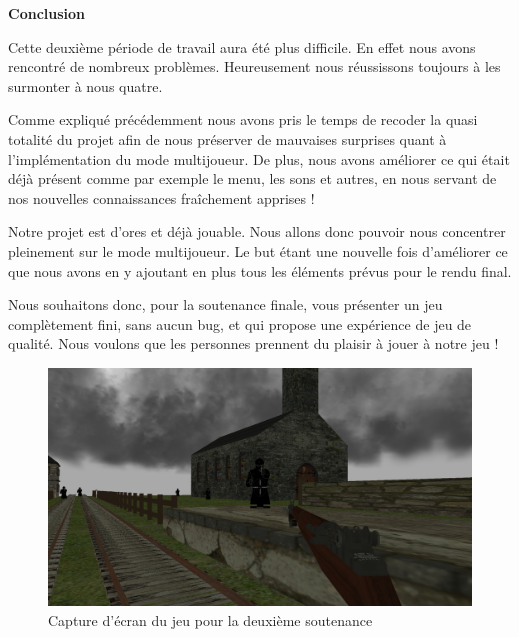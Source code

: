 \documentclass[11pt]{report}
\begin{document}
\newpage
\textbf{{\huge Conclusion}} \vspace{7mm}

Cette deuxième période de travail aura été plus difficile. En effet nous avons rencontré de nombreux problèmes. Heureusement nous réussissons toujours à les surmonter à nous quatre. 

Comme expliqué précédemment nous avons pris le temps de recoder la quasi totalité du projet afin de nous préserver de mauvaises surprises quant à l'implémentation du mode multijoueur. De plus, nous avons améliorer ce qui était déjà présent comme par exemple le menu, les sons et autres, en nous servant de nos nouvelles connaissances fraîchement apprises !

Notre projet est d'ores et déjà jouable. Nous allons donc pouvoir nous concentrer pleinement sur le mode multijoueur. Le but étant une nouvelle fois d’améliorer ce que nous avons en y ajoutant en plus tous les éléments prévus pour le rendu final.

Nous souhaitons donc, pour la soutenance finale, vous présenter un jeu complètement fini, sans aucun bug,  et qui propose une expérience de jeu de qualité. Nous voulons que les personnes prennent du plaisir à jouer à notre jeu !\\

\begin{figure}[htbp]
\centering
\includegraphics[scale=0.20]{conclu-rendu.png}
\caption{ Capture d’écran du jeu pour la deuxième soutenance}
\end{figure}

\newpage
\listoffigures 
 
\end{document}
